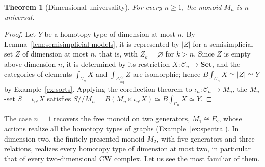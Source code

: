 \documentclass[11pt]{amsart}
\newtheorem{theorem}[teo]{Theorem}
\theoremstyle{definition}
\theoremstyle{remark}
\numberwithin{figure}{section}%
\newcommand{\CC}{\mathcal{C}}
\newcommand{\Set}{\mathbf{Set}}
\newcommand{\Dinj}{\Delta_{\mathrm{inj}}}
\newcommand{\op}{\mathrm{op}}
\begin{document}
\begin{theorem}[Dimensional universality]
\label{thm:Mn-n-universal}
For every $n\geq1$, the monoid $M_n$ is $n$-universal.
\end{theorem}

\begin{proof}
Let $Y$ be a homotopy type of dimension at most $n$. By Lemma~\ref{lem:semisimplicial-models}, it is represented by $|Z|$ for a semisimplicial set $Z$ of dimension at most $n$, that is, with $Z_k=\varnothing$ for $k>n$. Since $Z$ is empty above dimension $n$, it is determined by its restriction $X\colon\CC_n\to\Set$, and the categories of elements $\int_{\CC_n}X$ and $\int_{\Dinj^{\op}}Z$ are isomorphic; hence $B\!\int_{\CC_n}X\simeq|Z|\simeq Y$ by Example~\ref{ex:sorts}. Applying the coreflection theorem to $\iota_n\colon\CC_n\to M_n$, the $M_n$-set $S=\iota_{n!}X$ satisfies $S/\!/M_n=B(M_n\ltimes\iota_{n!}X)\simeq B\!\int_{\CC_n}X\simeq Y$.
\end{proof}

The case $n=1$ recovers the free monoid on two generators, $M_1\cong F_2$, whose actions realize all the homotopy types of graphs (Example~\ref{ex:spectra}). In dimension two, the finitely presented monoid $M_2$, with five generators and three relations, realizes every homotopy type of dimension at most two, in particular that of every two-dimensional CW complex. Let us see the most familiar of them.
\end{document}

